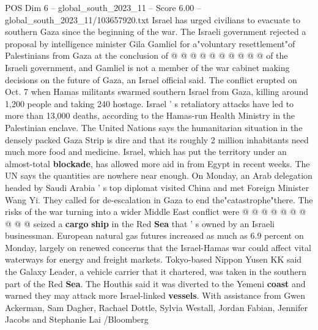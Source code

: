 \begin{textsample}{POS Dim 6 – global\_south\_2023\_11 – Score 6.00 – global\_south\_2023\_11/103657920.txt}
Israel has urged civilians to evacuate to southern Gaza since the beginning of the war.
The Israeli government rejected a proposal by intelligence minister Gila Gamliel for a"voluntary resettlement"of Palestinians from Gaza at the conclusion of @ @ @ @ @ @ @ @ @ @ of the Israeli government, and Gamliel is not a member of the war cabinet making decisions on the future of Gaza, an Israel official said.
The conflict erupted on Oct. 7 when Hamas militants swarmed southern Israel from Gaza, killing around 1,200 people and taking 240 hostage.
Israel ' s retaliatory attacks have led to more than 13,000 deaths, according to the Hamas-run Health Ministry in the Palestinian enclave.
The United Nations says the humanitarian situation in the densely packed Gaza Strip is dire and that its roughly 2 million inhabitants need much more food and medicine.
Israel, which has put the territory under an almost-total \textbf{blockade}, has allowed more aid in from Egypt in recent weeks.
The UN says the quantities are nowhere near enough.
On Monday, an Arab delegation headed by Saudi Arabia ' s top diplomat visited China and met Foreign Minister Wang Yi.
They called for de-escalation in Gaza to end the"catastrophe"there.
The risks of the war turning into a wider Middle East conflict were @ @ @ @ @ @ @ @ @ @ seized a \textbf{cargo} \textbf{ship} in the Red \textbf{Sea} that ' s owned by an Israeli businessman.
European natural gas futures increased as much as 6.9 percent on Monday, largely on renewed concerns that the Israel-Hamas war could affect vital waterways for energy and freight markets.
Tokyo-based Nippon Yusen KK said the Galaxy Leader, a vehicle carrier that it chartered, was taken in the southern part of the Red \textbf{Sea}.
The Houthis said it was diverted to the Yemeni \textbf{coast} and warned they may attack more Israel-linked \textbf{vessels}.
With assistance from Gwen Ackerman, Sam Dagher, Rachael Dottle, Sylvia Westall, Jordan Fabian, Jennifer Jacobs and Stephanie Lai /Bloomberg

\end{textsample}
